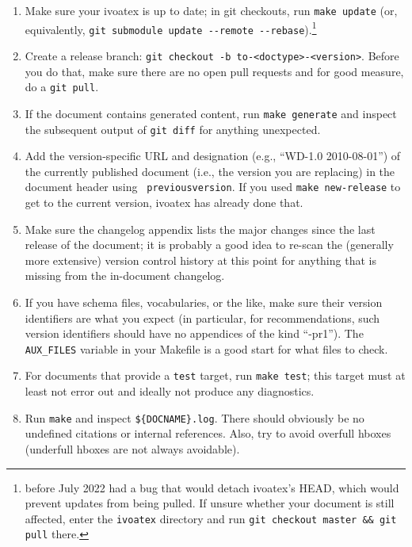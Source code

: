 \documentclass[11pt,a4paper]{ivoa}
\newcommand{\texword}[1]{\texttt{\color{texcolor} #1}}
\begin{document}
\begin{enumerate}
\item Make sure your ivoatex is up to date; in git checkouts, run
\verb|make update| (or, equivalently,
\verb|git submodule update --remote --rebase|).\footnote{\ivoatex{} before
July 2022 had a bug that would detach ivoatex's HEAD, which would
prevent \ivoatex{} updates from being pulled.  If unsure whether your
document is still affected, enter the \texttt{ivoatex} directory and run
\texttt{git checkout master \&\& git pull} there.}

\item Create a release branch:
\verb|git checkout -b to-<doctype>-<version>|.  Before you do that, make
sure there are no open pull requests and for good measure, do a
\verb|git pull|.

\item If the document contains generated content, run
\verb|make generate|
and inspect the subsequent output of
\verb|git diff|
for anything unexpected.

\item Add the version-specific URL and designation (e.g.,
``WD-1.0 2010-08-01'') of the currently
published document (i.e., the version you are replacing) in the document
header using \texword{previousversion}.  If you used
\verb|make new-release|
to get to the current version, ivoatex has already done
that.

\item Make sure the changelog appendix lists the major changes since the
last release of the document; it is probably a good idea to re-scan the
(generally more extensive) version control history at this point for
anything that is missing from the in-document changelog.

\item If you have schema files, vocabularies, or the like, make sure
their version identifiers are what you expect (in particular, for
recommendations, such version identifiers should have no appendices
of the kind ``-pr1'').  The \verb|AUX_FILES| variable in your Makefile is
a good start for what files to check.

\item For documents that provide a \verb|test| target, run
\verb|make test|;
this target must at least not error out and ideally not produce
any diagnostics.

\item Run \verb|make| and inspect \verb|${DOCNAME}.log|.  There should
obviously be no undefined citations or internal references.  Also, try
to avoid overfull hboxes (underfull hboxes are not always avoidable).


\end{enumerate}
\end{document}
